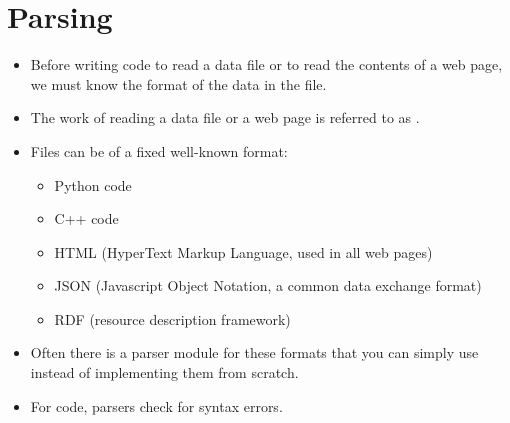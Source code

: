 \documentclass[letterpaper,10pt,english]{sphinxmanual}
\begin{document}
\section{Parsing}
\label{\detokenize{lecture_notes/lec13_files_web:parsing}}\begin{itemize}
\item {} 
Before writing code to read a data file or to read the contents of a
web page, we must know the format of the data in the file.

\item {} 
The work of reading a data file or a web page is referred to as
.

\item {} 
Files can be of a fixed well-known format:
\begin{itemize}
\item {} 
Python code

\item {} 
C++ code

\item {} 
HTML (HyperText Markup Language, used in all web pages)

\item {} 
JSON (Javascript Object Notation, a common data exchange format)

\item {} 
RDF (resource description framework)

\end{itemize}

\item {} 
Often there is a parser module for these formats that you can
simply use instead of implementing them from scratch.

\item {} 
For code, parsers check for syntax errors.

\end{itemize}
\end{document}
